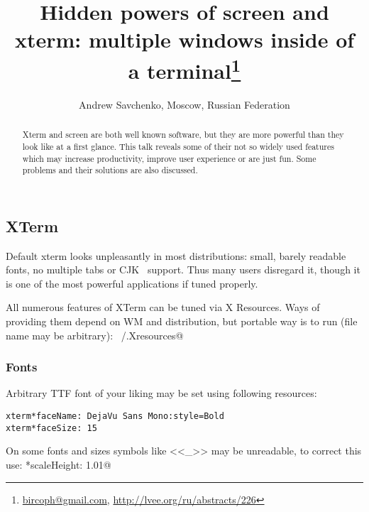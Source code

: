 \documentclass[10pt, a5paper]{article}
\begin{document}
\title{Hidden powers of screen and xterm: multiple windows inside of a terminal\footnote{\url{bircoph@gmail.com}, \url{http://lvee.org/ru/abstracts/226}}}
\author{Andrew Savchenko, Moscow, Russian Federation}
\maketitle
\begin{abstract}
Xterm and screen are both well known software, but they are more powerful than they look like at a first glance. This talk reveals some of their not so widely used features which may increase productivity, improve user experience or are just fun. Some problems and their solutions are also discussed.
\end{abstract}

\lstset{ %
language=C,                 %
basicstyle=\small\sffamily, %
breaklines=true,           %
breakatwhitespace=false, %
}

\subsection*{XTerm}

Default xterm looks unpleasantly in most distributions: small, barely readable fonts, no multiple tabs or CJK~\cite{Savchenko1} support. Thus many users disregard it, though it is one of the most powerful applications if tuned properly.

All numerous features of XTerm can be tuned via X Resources. Ways of providing them depend on WM and distribution, but portable way is to run (file name may be arbitrary):
\verb@xrdb ~/.Xresources@

\subsubsection*{Fonts}

Arbitrary TTF font of your liking may be set using following \linebreak resources:

\begin{verbatim}
xterm*faceName: DejaVu Sans Mono:style=Bold
xterm*faceSize: 15
\end{verbatim}
On some fonts and sizes symbols like <<\_>> may be unreadable, to correct this use:
\verb@xterm*scaleHeight: 1.01@
\end{document}
